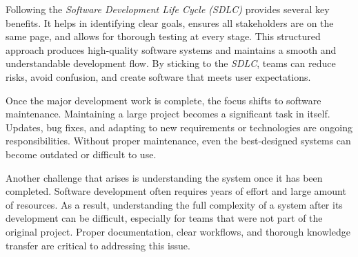 Following the \textit{Software Development Life Cycle (SDLC)} provides several key benefits. It helps in identifying clear goals, ensures all stakeholders are on the same page, and allows for thorough testing at every stage. This structured approach produces high-quality software systems and maintains a smooth and understandable development flow. By sticking to the \textit{SDLC}, teams can reduce risks, avoid confusion, and create software that meets user expectations.

Once the major development work is complete, the focus shifts to software maintenance. Maintaining a large project becomes a significant task in itself. Updates, bug fixes, and adapting to new requirements or technologies are ongoing responsibilities. Without proper maintenance, even the best-designed systems can become outdated or difficult to use.

Another challenge that arises is understanding the system once it has been completed. Software development often requires years of effort and large amount of resources. As a result, understanding the full complexity of a system after its development can be difficult, especially for teams that were not part of the original project. Proper documentation, clear workflows, and thorough knowledge transfer are critical to addressing this issue.